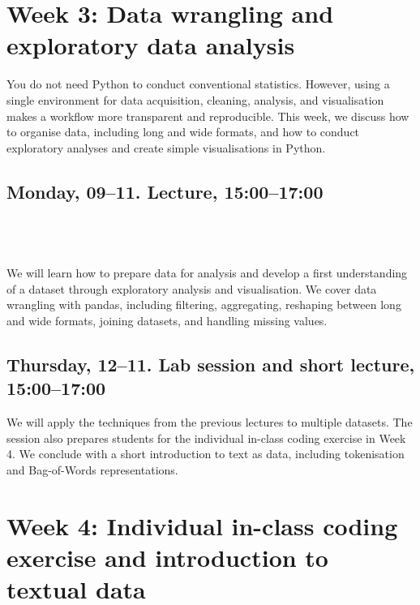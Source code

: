 
\section*{Week 3: Data wrangling and exploratory data analysis}

You do not need Python to conduct conventional statistics. However, using a single environment for data acquisition, cleaning, analysis, and visualisation makes a workflow more transparent and reproducible. This week, we discuss how to organise data, including long and wide formats, and how to conduct exploratory analyses and create simple visualisations in Python.

\subsection*{Monday, 09--11. Lecture, 15:00--17:00}

\\
\\
\\

We will learn how to prepare data for analysis and develop a first understanding of a dataset through exploratory analysis and visualisation. We cover data wrangling with pandas, including filtering, aggregating, reshaping between long and wide formats, joining datasets, and handling missing values.

\subsection*{Thursday, 12--11. Lab session and short lecture, 15:00--17:00}

We will apply the techniques from the previous lectures to multiple datasets. The session also prepares students for the individual in-class coding exercise in Week 4. We conclude with a short introduction to text as data, including tokenisation and Bag-of-Words representations.


\section*{Week 4: Individual in-class coding exercise and introduction to textual data}

